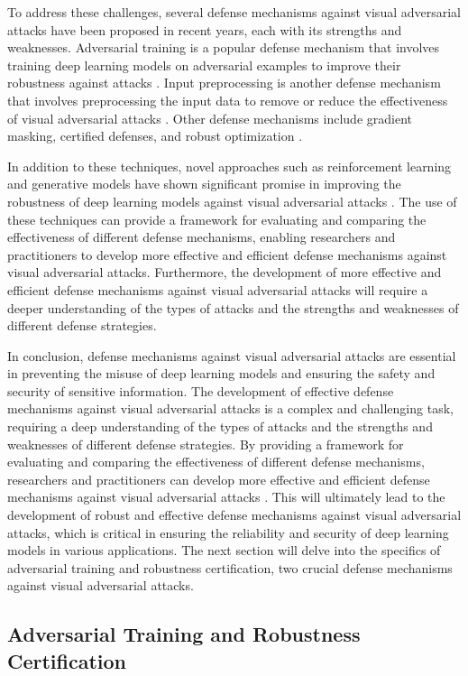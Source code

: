 \documentclass[11pt]{article}
\begin{document}
To address these challenges, several defense mechanisms against visual adversarial attacks have been proposed in recent years, each with its strengths and weaknesses. Adversarial training is a popular defense mechanism that involves training deep learning models on adversarial examples to improve their robustness against attacks \cite{ref106}. Input preprocessing is another defense mechanism that involves preprocessing the input data to remove or reduce the effectiveness of visual adversarial attacks \cite{ref107}. Other defense mechanisms include gradient masking, certified defenses, and robust optimization \cite{ref6}.

In addition to these techniques, novel approaches such as reinforcement learning and generative models have shown significant promise in improving the robustness of deep learning models against visual adversarial attacks \cite{ref108}. The use of these techniques can provide a framework for evaluating and comparing the effectiveness of different defense mechanisms, enabling researchers and practitioners to develop more effective and efficient defense mechanisms against visual adversarial attacks. Furthermore, the development of more effective and efficient defense mechanisms against visual adversarial attacks will require a deeper understanding of the types of attacks and the strengths and weaknesses of different defense strategies.

In conclusion, defense mechanisms against visual adversarial attacks are essential in preventing the misuse of deep learning models and ensuring the safety and security of sensitive information. The development of effective defense mechanisms against visual adversarial attacks is a complex and challenging task, requiring a deep understanding of the types of attacks and the strengths and weaknesses of different defense strategies. By providing a framework for evaluating and comparing the effectiveness of different defense mechanisms, researchers and practitioners can develop more effective and efficient defense mechanisms against visual adversarial attacks \cite{ref109}. This will ultimately lead to the development of robust and effective defense mechanisms against visual adversarial attacks, which is critical in ensuring the reliability and security of deep learning models in various applications. The next section will delve into the specifics of adversarial training and robustness certification, two crucial defense mechanisms against visual adversarial attacks.

\subsection{Adversarial Training and Robustness Certification}
\end{document}
